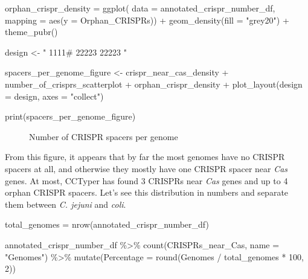 \documentclass[
  twocolumn,
  landscape]{report}
\newenvironment{Shaded}{}{}
\newcommand{\AttributeTok}[1]{\textcolor[rgb]{0.84,0.23,0.29}{#1}}
\newcommand{\DecValTok}[1]{\textcolor[rgb]{0.00,0.36,0.77}{#1}}
\newcommand{\FunctionTok}[1]{\textcolor[rgb]{0.44,0.26,0.76}{#1}}
\newcommand{\NormalTok}[1]{\textcolor[rgb]{0.14,0.16,0.18}{#1}}
\newcommand{\OtherTok}[1]{\textcolor[rgb]{0.44,0.26,0.76}{#1}}
\newcommand{\SpecialCharTok}[1]{\textcolor[rgb]{0.00,0.36,0.77}{#1}}
\newcommand{\StringTok}[1]{\textcolor[rgb]{0.01,0.18,0.38}{#1}}
\begin{document}
\begin{Shaded}
\begin{Highlighting}[]
\NormalTok{orphan\_crispr\_density }\OtherTok{=} \FunctionTok{ggplot}\NormalTok{(}
  \AttributeTok{data =}\NormalTok{ annotated\_crispr\_number\_df,}
  \AttributeTok{mapping =} \FunctionTok{aes}\NormalTok{(}\AttributeTok{y =}\NormalTok{ Orphan\_CRISPRs)) }\SpecialCharTok{+}
  \FunctionTok{geom\_density}\NormalTok{(}\AttributeTok{fill =} \StringTok{"grey20"}\NormalTok{) }\SpecialCharTok{+}
  \FunctionTok{theme\_pubr}\NormalTok{()}

\NormalTok{design }\OtherTok{\textless{}{-}} \StringTok{"}
\StringTok{1111\#}
\StringTok{22223}
\StringTok{22223}
\StringTok{"}

\NormalTok{spacers\_per\_genome\_figure }\OtherTok{\textless{}{-}}\NormalTok{ crispr\_near\_cas\_density }\SpecialCharTok{+}
\NormalTok{  number\_of\_crisprs\_scatterplot }\SpecialCharTok{+}
\NormalTok{  orphan\_crispr\_density }\SpecialCharTok{+}
  \FunctionTok{plot\_layout}\NormalTok{(}\AttributeTok{design =}\NormalTok{ design,}
              \AttributeTok{axes =} \StringTok{"collect"}\NormalTok{)}

\FunctionTok{print}\NormalTok{(spacers\_per\_genome\_figure)}
\end{Highlighting}
\end{Shaded}

\begin{figure}[H]


\caption{\label{fig-crisprs_per_genome}Number of CRISPR spacers per
genome}

\end{figure}%

From this figure, it appears that by far the most genomes have no CRISPR
spacers at all, and otherwise they mostly have one CRISPR spacer near
\emph{Cas} genes. At most, CCTyper has found 3 CRISPRs near \emph{Cas}
genes and up to 4 orphan CRISPR spacers. Let's see this distribution in
numbers and separate them between \emph{C. jejuni} and \emph{coli}.

\begin{Shaded}
\begin{Highlighting}[]
\NormalTok{total\_genomes }\OtherTok{=} \FunctionTok{nrow}\NormalTok{(annotated\_crispr\_number\_df)}

\NormalTok{annotated\_crispr\_number\_df }\SpecialCharTok{\%\textgreater{}\%}
  \FunctionTok{count}\NormalTok{(CRISPRs\_near\_Cas, }\AttributeTok{name =} \StringTok{"Genomes"}\NormalTok{) }\SpecialCharTok{\%\textgreater{}\%}
  \FunctionTok{mutate}\NormalTok{(}\AttributeTok{Percentage =} \FunctionTok{round}\NormalTok{(Genomes }\SpecialCharTok{/}\NormalTok{ total\_genomes }\SpecialCharTok{*} \DecValTok{100}\NormalTok{, }\DecValTok{2}\NormalTok{))}
\end{Highlighting}
\end{Shaded}
\end{document}
